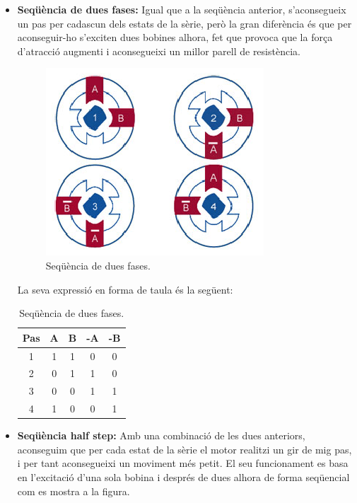 \begin{itemize}
		\item \textbf{Seqüència de dues fases:} Igual que a la seqüència anterior, s'aconsegueix un pas per cadascun dels estats de la sèrie, però la gran diferència és que per aconseguir-ho s'exciten dues bobines alhora, fet que provoca que la força d'atracció augmenti i aconsegueixi un millor parell de resistència. 
		\begin{figure}[H]
			\centering
			\includegraphics[scale=1.2]{Sequencia_2_fases.eps}
			\caption{Seqüència de dues fases.}
			\label{fig:Sequencia de dos fase}
		\end{figure}
		La seva expressió en forma de taula és la següent:
		\begin{table}[H]
			\begin{center}
				\begin{tabular}{|c||c|c|c|c|}
					\hline
					Pas & A & B & -A & -B \\
					\hline \hline
					1 & 1 & 1 & 0 & 0 \\ \hline
					2 & 0 & 1 & 1 & 0 \\ \hline
					3 & 0 & 0 & 1 & 1 \\ \hline
					4 & 1 & 0 & 0 & 1 \\ \hline
				\end{tabular}
				\caption{Seqüència de dues fases.}
				\label{tabla:2fase}
			\end{center}
		\end{table}
		
		\item \textbf{Seqüència half step:} Amb una combinació de les dues anteriors, aconseguim que per cada estat de la sèrie el motor realitzi un gir de mig pas, i per tant aconsegueixi un moviment més petit. El seu funcionament es basa en l'excitació d'una sola bobina i després de dues alhora de forma seqüencial com es mostra  a la figura.
		

\end{itemize}
